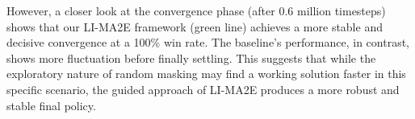 However, a closer look at the convergence phase (after 0.6 million timesteps) shows that our LI-MA2E framework (green line) achieves a more stable and decisive convergence at a 100\% win rate. The baseline's performance, in contrast, shows more fluctuation before finally settling. This suggests that while the exploratory nature of random masking may find a working solution faster in this specific scenario, the guided approach of LI-MA2E produces a more robust and stable final policy.



